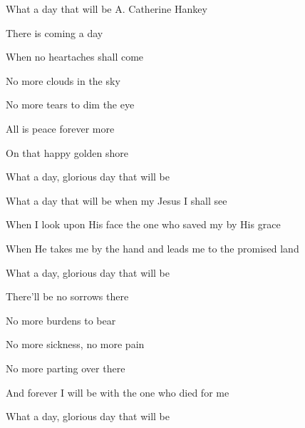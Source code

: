 \documentclass[12pt]{book}
\newcommand{\WBColBrk}{%
  \ifWordBk%
  \newpage%
\fi}
\begin{document}
\begin{song}{What a day that will be}{}
  {\SBPubDom}
  {A. Catherine Hankey}
  {}
  {}

  \begin{SBVerse}

    There is coming a day

    When no heartaches shall come

    No more clouds in the sky

    No more tears to dim the eye

    All is peace forever more

    On that happy golden shore

    What a day, glorious day that will be
  \end{SBVerse}
  \begin{SBOpGroup}
    What a day that will be when my Jesus I shall see

    When I look upon His face the one who saved my by His grace

    When He takes me by the hand and leads me to the promised land

    What a day, glorious day that will be

  \end{SBOpGroup}
  \begin{SBVerse}
    There'll be no sorrows there

    No more burdens to bear

    No more sickness, no more pain

    No more parting over there

    And forever I will be with the one who died for me

    What a day, glorious day that will be
  \end{SBVerse}

\end{song}

\WBColBrk
\end{document}
